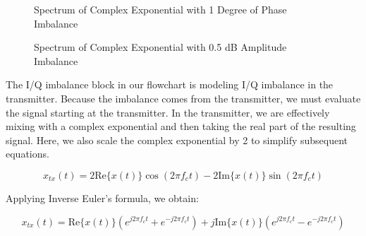 \documentclass{article}
\begin{document}
\begin{figure}[H]
	\centerline{}
	\caption{Spectrum of Complex Exponential with 1 Degree of Phase Imbalance}
	\label{fig::iq_imbalance_0_mag_1_phase_freq}
\end{figure}

\begin{figure}[H]
	\centerline{}
	\caption{Spectrum of Complex Exponential with 0.5 dB Amplitude Imbalance}
	\label{fig::iq_imbalance_0p5_mag_0_phase_freq}
\end{figure}

The I/Q imbalance block in our flowchart is modeling I/Q imbalance in the transmitter. Because the imbalance comes from the transmitter, we must evaluate the signal starting at the transmitter. In the transmitter, we are effectively mixing with a complex exponential and then taking the real part of the resulting signal. Here, we also scale the complex exponential by 2 to simplify subsequent equations.

\begin{equation}
	x_{tx}(t) = 2\text{Re}\{x(t)\}\cos(2{\pi}f_ct) - 2\text{Im}\{x(t)\}\sin(2{\pi}f_ct)
\end{equation}

Applying Inverse Euler's formula, we obtain:

\begin{equation}
	x_{tx}(t) = \text{Re}\{x(t)\}(e^{j2{\pi}f_ct} + e^{-j2{\pi}f_ct}) + j\text{Im}\{x(t)\}(e^{j2{\pi}f_ct} - e^{-j2{\pi}f_ct})
\end{equation}
\end{document}
